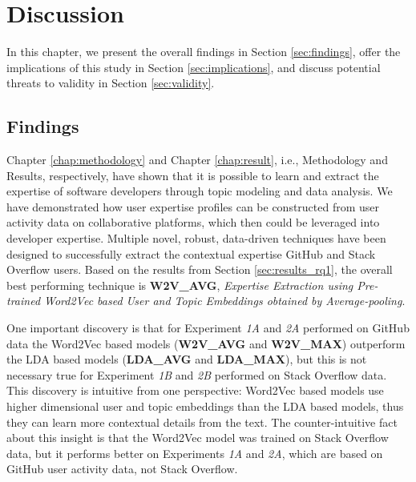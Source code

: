 \chapter{Discussion\label{chap:discussion}}

  In this chapter, we present the overall findings in Section \ref{sec:findings}, offer the implications of this study in Section \ref{sec:implications}, and discuss potential threats to validity in Section \ref{sec:validity}.
    
    \section{Findings\label{sec:findings}}
        Chapter \ref{chap:methodology} and Chapter \ref{chap:result}, i.e., Methodology and Results, respectively, have shown that it is possible to learn and extract the expertise of software developers through topic modeling and data analysis. We have demonstrated how user expertise profiles can be constructed from user activity data on collaborative platforms, which then could be leveraged into developer expertise. Multiple novel, robust, data-driven techniques have been designed to successfully extract the contextual expertise GitHub and Stack Overflow users. Based on the results from Section \ref{sec:results_rq1}, the overall best performing technique is \textbf{W2V\_AVG}, \emph{Expertise Extraction using Pre-trained Word2Vec based User and Topic Embeddings obtained by Average-pooling}. 
        
        One important discovery is that for Experiment \emph{1A} and \emph{2A} performed on GitHub data the Word2Vec based models (\textbf{W2V\_AVG} and \textbf{W2V\_MAX}) outperform the LDA based models (\textbf{LDA\_AVG} and \textbf{LDA\_MAX}), but this is not necessary true for Experiment \emph{1B} and \emph{2B} performed on Stack Overflow data. This discovery is intuitive from one perspective: Word2Vec based models use higher dimensional user and topic embeddings than the LDA based models, thus they can learn more contextual details from the text. The counter-intuitive fact about this insight is that the Word2Vec model was trained on Stack Overflow data, but it performs better on Experiments \emph{1A} and \emph{2A}, which are based on GitHub user activity data, not Stack Overflow. 
        
